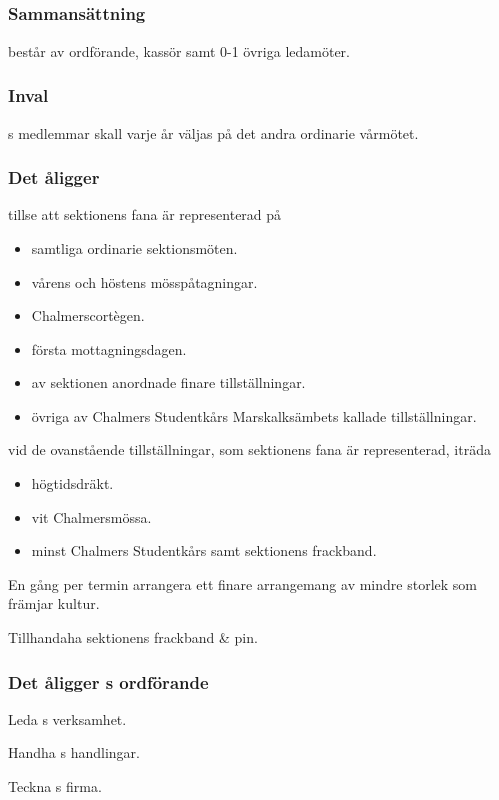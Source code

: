 \subsection{\FANBARERITFULL}
\subsubsection{Sammansättning}
\FANBARERIT{} består av ordförande, kassör samt 0-1 övriga ledamöter.

\subsubsection{Inval}
\FANBARERIT{}s medlemmar skall varje år väljas på det andra ordinarie vårmötet.

\subsubsection{Det åligger \FANBARERIT}
\label{sec:fanbarerit:function}
\begin{att}
	\item tillse att sektionens fana är representerad på
	\begin{itemize}
		\item samtliga ordinarie sektionsmöten.
		\item vårens och höstens mösspåtagningar.
		\item Chalmerscortègen.
		\item första mottagningsdagen.
		\item av sektionen anordnade finare tillställningar.
		\item övriga av Chalmers Studentkårs Marskalksämbets kallade tillställningar.
	\end{itemize}
	\item vid de ovanstående tillställningar, som sektionens fana är representerad, iträda
	\begin{itemize}
		\item högtidsdräkt.
		\item vit Chalmersmössa.
		\item minst Chalmers Studentkårs samt sektionens frackband.
	\end{itemize}
	\item En gång per termin arrangera ett finare arrangemang av mindre storlek som främjar kultur.
	\item Tillhandaha sektionens frackband \& pin.
\end{att}

\subsubsection{Det åligger \FANBARERIT{}s ordförande}
\begin{att}
	\item Leda \FANBARERIT{}s verksamhet.
	\item Handha \FANBARERIT{}s handlingar.
	\item Teckna \FANBARERIT{}s firma.
\end{att}

